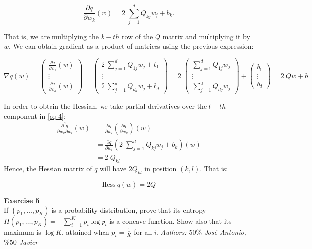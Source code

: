 \documentclass[11pt,table]{article}
\newenvironment{problem}[2][Exercise]
{ \begin{mdframed}[backgroundcolor=gray!20] \textbf{#1 #2} \\}
	{\hspace{0.0cm}\newline\newline \emph{Authors: \(50\%\) José Antonio, \(\%50\) Javier}  \end{mdframed}}
\begin{document}
\begin{equation}
	\label{eq-4}
	\frac{\partial q}{\partial w_k} (w) = 2 \; \sum_{j=1}^{d} Q_{kj} w_{j} + b_{k}.
\end{equation}

That is, we are multiplying the \(k-th\) row of the \(Q\) matrix and multiplying it by \(w\). We can obtain gradient as a product of matrices using the previous expression:

\[
	\nabla q(w) = \begin{pmatrix}
		\frac{\partial q}{\partial w_1} (w) \\
		\vdots                              \\
		\frac{\partial q}{\partial w_d} (w)
	\end{pmatrix}
	= \begin{pmatrix}
		2 \; \sum_{j=1}^{d} Q_{1j} w_{j} + b_{1} \\
		\vdots                                   \\
		2 \; \sum_{j=1}^{d} Q_{dj} w_{j} + b_{d}
	\end{pmatrix}
	= 2 \; \begin{pmatrix}
		\sum_{j=1}^{d} Q_{1j} w_{j} \\
		\vdots                      \\
		\sum_{j=1}^{d} Q_{dj} w_{j}
	\end{pmatrix} + \begin{pmatrix}
		b_{1}  \\
		\vdots \\
		b_{d}
	\end{pmatrix}
	= 2 \ Qw + b
\]

In order to obtain the Hessian, we take partial derivatives over the \(l-th\) component in \ref{eq-4}:
\begin{align*}
	\frac{\partial^2 q}{\partial w_k \partial w_l} (w) & = \frac{\partial q}{\partial w_l} \left( \frac{\partial q}{\partial w_k} \right) (w)          \\
	                                                   & = \frac{\partial q}{\partial w_l} \left( 2 \; \sum_{j=1}^{d} Q_{kj} w_{j} + b_{k} \right) (w) \\
	                                                   & = 2 \; Q_{kl}
\end{align*}
Hence, the Hessian matrix of \(q\) will have \(2 Q_{kl}\) in position \((k, l)\). That is:

\[
	\text{Hess} \ q(w) = 2Q
\]

\begin{problem}{5}
If \( (p_1,\dots,p_K) \) is a probability distribution, prove that its entropy \( H(p_1, \dots, p_K) = - \sum_{i=1}^K p_i \log p_i\) is a concave function. Show also that its maximum is \( \log K \), attained when \( p_i = \frac{1}{K}\) for all $i$.
\end{problem}
\end{document}
